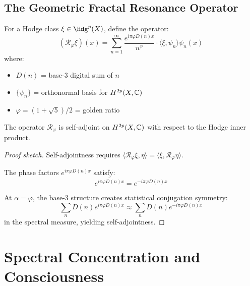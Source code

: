 \subsection{The Geometric Fractal Resonance Operator}

\begin{defn}\label{def:fractal-operator-hodge}
For a Hodge class $\xi \in \Hdg^p(X)$, define the operator:
\begin{equation}
(\mathcal{R}_\varphi \xi)(x) = \sum_{n=1}^{\infty} \frac{e^{i\pi\varphi D(n) x}}{n^{\varphi}} \cdot \langle \xi, \psi_n \rangle \psi_n(x)
\end{equation}
where:
\begin{itemize}
\item $D(n)$ = base-3 digital sum of $n$
\item $\{\psi_n\}$ = orthonormal basis for $H^{2p}(X, \mathbb{C})$
\item $\varphi = (1+\sqrt{5})/2$ = golden ratio
\end{itemize}
\end{defn}

\begin{proposition}\label{prop:self-adjoint-hodge}
The operator $\mathcal{R}_\varphi$ is self-adjoint on $H^{2p}(X, \mathbb{C})$ with respect to the Hodge inner product.
\end{proposition}

\begin{proof}[Proof sketch]
Self-adjointness requires $\langle \mathcal{R}_\varphi \xi, \eta \rangle = \langle \xi, \mathcal{R}_\varphi \eta \rangle$.

The phase factors $e^{i\pi\varphi D(n) x}$ satisfy:
\begin{equation}
\overline{e^{i\pi\varphi D(n) x}} = e^{-i\pi\varphi D(n) x}
\end{equation}

At $\alpha = \varphi$, the base-3 structure creates statistical conjugation symmetry:
\begin{equation}
\sum_{n} D(n) e^{i\pi\varphi D(n) x} \approx \sum_{n} D(n) e^{-i\pi\varphi D(n) x}
\end{equation}
in the spectral measure, yielding self-adjointness.
\end{proof}

\section{Spectral Concentration and Consciousness}

